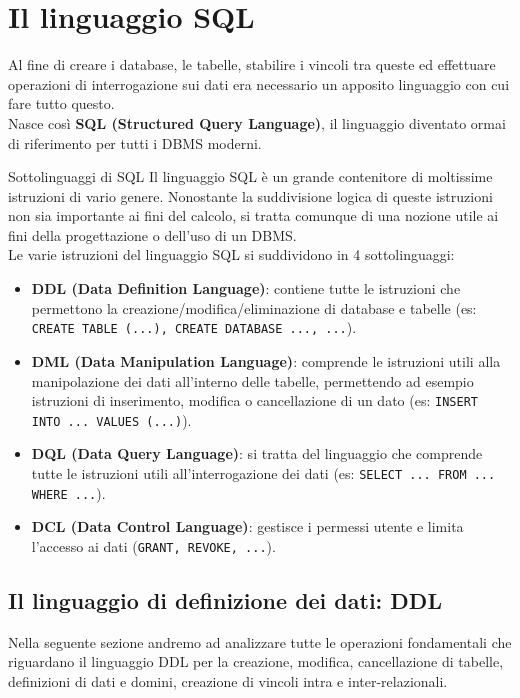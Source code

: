 \documentclass[12pt]{report}
\begin{document}
	\chapter{Il linguaggio SQL}
	Al fine di creare i database, le tabelle, stabilire i vincoli tra queste ed effettuare operazioni di interrogazione sui dati era necessario un apposito linguaggio con cui fare tutto questo.\\
	Nasce così \textbf{SQL (Structured Query Language)}, il linguaggio diventato ormai di riferimento per tutti i DBMS moderni.
	\begin{definizione}{Sottolinguaggi di SQL}{}
		Il linguaggio SQL è un grande contenitore di moltissime istruzioni di vario genere. Nonostante la suddivisione logica di queste istruzioni non sia importante ai fini del calcolo, si tratta comunque di una nozione utile ai fini della progettazione o dell'uso di un DBMS.\\
		Le varie istruzioni del linguaggio SQL si suddividono in 4 sottolinguaggi:
		\begin{itemize}
			\item \textbf{DDL (Data Definition Language)}: contiene tutte le istruzioni che permettono la creazione/modifica/eliminazione di database e tabelle (es: \texttt{CREATE TABLE (...), CREATE DATABASE ..., ...}).
			
			\item \textbf{DML (Data Manipulation Language)}: comprende le istruzioni utili alla manipolazione dei dati all'interno delle tabelle, permettendo ad esempio istruzioni di inserimento, modifica o cancellazione di un dato (es: \texttt{INSERT INTO ... VALUES (...)}).
			
			\item \textbf{DQL (Data Query Language)}: si tratta del linguaggio che comprende tutte le istruzioni utili all'interrogazione dei dati (es: \texttt{SELECT ... FROM ... WHERE ...}).
			
			\item \textbf{DCL (Data Control Language)}: gestisce i permessi utente e limita l'accesso ai dati (\texttt{GRANT, REVOKE, ...}).
		\end{itemize}
	\end{definizione}
	
	\section{Il linguaggio di definizione dei dati: DDL}
	Nella seguente sezione andremo ad analizzare tutte le operazioni fondamentali che riguardano il linguaggio DDL per la creazione, modifica, cancellazione di tabelle, definizioni di dati e domini, creazione di vincoli intra e inter-relazionali.
	
\end{document}
